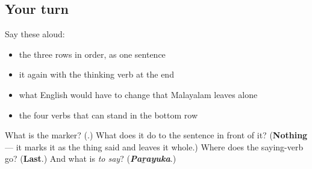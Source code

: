 \subsection*{Your turn}
Say these aloud:

\begin{itemize}
\raggedright
  \item the three rows in order, as one sentence
  \item it again with the thinking verb at the end
  \item what English would have to change that Malayalam leaves alone
  \item the four verbs that can stand in the bottom row
\end{itemize}

\begin{tcolorbox}[breakable,colback=teal!4,colframe=teal!35!black,title={Before you move on}]
What is the marker? (\textbf{}.) What does it do to the sentence in front of it? (\textbf{Nothing} — it marks it as the thing said and leaves it whole.) Where does the saying-verb go? (\textbf{Last}.) And what is \emph{to say}? (\emph{\textbf{Paṟayuka}}.)
\end{tcolorbox}
